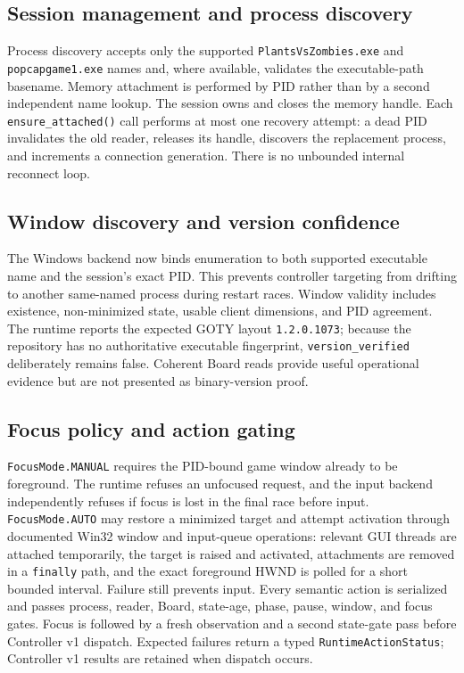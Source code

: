 \documentclass[11pt,a4paper]{article}
\begin{document}
\subsection{Session management and process discovery}
Process discovery accepts only the supported \texttt{PlantsVsZombies.exe} and \texttt{popcapgame1.exe} names and, where available, validates the executable-path basename. Memory attachment is performed by PID rather than by a second independent name lookup. The session owns and closes the memory handle. Each \texttt{ensure\_attached()} call performs at most one recovery attempt: a dead PID invalidates the old reader, releases its handle, discovers the replacement process, and increments a connection generation. There is no unbounded internal reconnect loop.

\subsection{Window discovery and version confidence}
The Windows backend now binds enumeration to both supported executable name and the session's exact PID. This prevents controller targeting from drifting to another same-named process during restart races. Window validity includes existence, non-minimized state, usable client dimensions, and PID agreement. The runtime reports the expected GOTY layout \texttt{1.2.0.1073}; because the repository has no authoritative executable fingerprint, \texttt{version\_verified} deliberately remains false. Coherent Board reads provide useful operational evidence but are not presented as binary-version proof.

\subsection{Focus policy and action gating}
\texttt{FocusMode.MANUAL} requires the PID-bound game window already to be foreground. The runtime refuses an unfocused request, and the input backend independently refuses if focus is lost in the final race before input. \texttt{FocusMode.AUTO} may restore a minimized target and attempt activation through documented Win32 window and input-queue operations: relevant GUI threads are attached temporarily, the target is raised and activated, attachments are removed in a \texttt{finally} path, and the exact foreground HWND is polled for a short bounded interval. Failure still prevents input. Every semantic action is serialized and passes process, reader, Board, state-age, phase, pause, window, and focus gates. Focus is followed by a fresh observation and a second state-gate pass before Controller v1 dispatch. Expected failures return a typed \texttt{RuntimeActionStatus}; Controller v1 results are retained when dispatch occurs.
\end{document}
